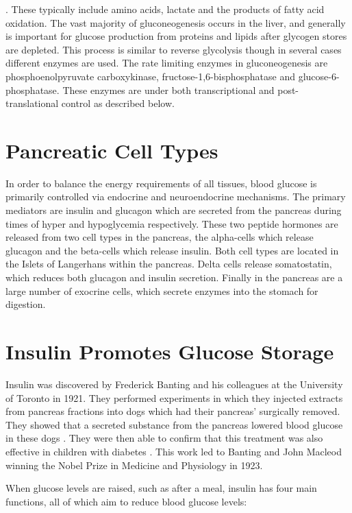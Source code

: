 \documentclass{tufte-handout}
\begin{document}
.  These typically include amino acids, lactate and the products of fatty acid oxidation.  The vast majority of gluconeogenesis occurs in the liver, and generally is important for glucose production from proteins and lipids after glycogen stores are depleted.  This process is similar to reverse glycolysis though in several cases different enzymes are used.  The rate limiting enzymes in gluconeogenesis are phosphoenolpyruvate carboxykinase, fructose-1,6-bisphosphatase and glucose-6-phosphatase.  These enzymes are under both transcriptional and post-translational control as described below.

\section{Pancreatic Cell Types}

In order to balance the energy requirements of all tissues, blood glucose is primarily controlled via endocrine and neuroendocrine mechanisms.  The primary mediators are insulin and glucagon which are secreted from the pancreas during times of hyper and hypoglycemia respectively.  These two peptide hormones are released from two cell types in the pancreas, the alpha-cells which release glucagon and the beta-cells which release insulin.  Both cell types are located in the Islets of Langerhans within the pancreas.  Delta cells release somatostatin, which reduces both glucagon and insulin secretion.  Finally in the pancreas are a large number of exocrine cells, which secrete enzymes into the stomach for digestion.


\section{Insulin Promotes Glucose Storage}

Insulin was discovered by Frederick Banting and his colleagues at the University of Toronto in 1921.  They performed experiments in which they injected extracts from pancreas fractions into dogs which had their pancreas' surgically removed.  They showed that a secreted substance from the pancreas lowered blood glucose in these dogs \cite{Banting1922}.  They were then able to confirm that this treatment was also effective in children with diabetes \cite{Banting1922a}.  This work led to Banting and John Macleod winning the Nobel Prize in Medicine and Physiology in 1923.

When glucose levels are raised, such as after a meal, insulin has four main functions, all of which aim to reduce blood glucose levels:
\end{document}
